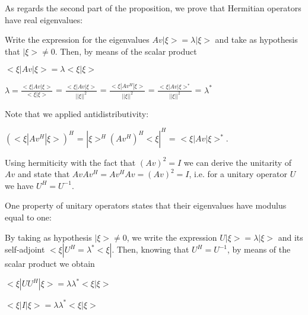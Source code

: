 \documentclass[12pt]{report}
\begin{document}
	\begin{minipage}{1\textwidth}
	    
	    
	    As regards the second part of the proposition, we prove that Hermitian operators have real eigenvalues: \newline
	    
	    Write the expression for the eigenvalues $Av |\xi> = \lambda |\xi>$ and take as hypothesis that $|\xi> \neq 0$. Then, by means of the scalar product\newline
	    
     	\begin{center}
	    $<\xi|Av|\xi> = \lambda <\xi |\xi>$\newline
	    
	    $\lambda = \frac {<\xi|Av|\xi>}{<\xi |\xi>}$ = $\frac {<\xi|Av|\xi>}{||\xi||^2}$ = $\frac {<\xi|Av^H|\xi>}{||\xi||^2}$ = $\frac {<\xi|Av|\xi>^*}{||\xi||^2}$ = $\lambda^*$\newline
	    \end{center}
	
	    Note that we applied antidistributivity: \newline
	    
	    \begin{center}
	    $(<\xi|Av^H|\xi>)^H$ = $|\xi>^H (Av^H)^H <\xi|^H$ = $<\xi|Av|\xi>^*$. \newline
	    \end{center}
	
	    Using hermiticity with the fact that $(Av)^2=I$ we can derive the unitarity of $Av$ and state that $Av Av^H = Av^H Av = (Av)^2 = I$, i.e. for a unitary operator $U$ we have $U^H=U^{-1}$. \newline
	    
	    One property of unitary operators states that their eigenvalues have modulus equal to one:\newline 
	    
	    
	    By taking as hypothesis $|\xi> \neq 0$, we write the expression $U |\xi> = \lambda |\xi>$ and its self-adjoint $<\xi| U^H = \lambda^* <\xi|$. Then, knowing that $U^H=U^{-1}$, by means of the scalar product we obtain \newline
	    
	    \begin{center}
	    $<\xi|U U^H|\xi> = \lambda \lambda^* <\xi |\xi>$\newline
	    
	    $<\xi|I|\xi> = \lambda \lambda^* <\xi |\xi>$\newline
	    

\end{center}
\end{minipage}
\end{document}
